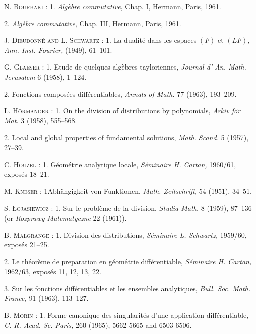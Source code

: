\begin{thebibliography}{99}\pageoriginale
{} \textsc{N. Bourbaki} : 1. {\em Alg\`ebre commutative}, Chap. I, Hermann, Paris, 1961.

 2. {\em Alg\`ebre commutative}, Chap. III, Hermann, Paris, 1961.

 \textsc{J. Dieudonn\'e and L. Schwartz :} 1. La dualit\'e dans les espaces $(F)$ et $(LF)$, {\em Ann. Inst. Fourier,} (1949), 61--101.

 \textsc{G. Glaeser} : 1. Etude de quelques alg\`ebres tayloriennes, {\em Journal d' An. Math. Jerusalem} 6 (1958), 1--124.

 2. Fonctions compos\'ees diff\'erentiables, {\em Annals of Math.} 77 (1963), 193--209.

 \textsc{L. H\"ormander} : 1. On the division of distributions by polynomials, {\em Arkiv f\"or Mat.} 3 (1958), 555--568.

 2. Local and global properties of fundamental solutions, {\em Math. Scand.} 5 (1957), 27--39.

 \textsc{C. Houzel} : 1. G\'eom\'etrie analytique locale, {\em S\'eminaire H. Cartan,} 1960/61, expos\'es 18--21.

 \textsc{M. Kneser} : 1Abh\"angigkeit von Funktionen, {\em Math. Zeitschrift,} 54 (1951), 34--51.

 \textsc{S. {\L}ojasiewicz} : 1. Sur le probl\`eme de la division, {\em Studia Math.} 8 (1959), 87--136 (or {\em Rozprawy Matematyczne} 22 (1961)).

 \textsc{B. Malgrange} : 1. Division des distributions, {\em S\'eminaire L. Schwartz,} 1959/60, expos\'es 21--25.

 2. Le th\'eor\`eme de preparation en g\'eom\'etrie diff\'erentiable, {\em S\'eminaire H. Cartan,} 1962/63, expos\'es 11, 12, 13, 22.

 3. Sur les fonctions diff\'erentiables et les ensembles analytiques, {\em Bull. Soc. Math. France,} 91 (1963), 113--127.

 \textsc{B. Morin} : 1. Forme canonique des singularit\'es d'une application diff\'erentiable, {\em C. R. Acad. Sc. Paris,} 260 (1965), 5662-5665 and 6503-6506.


\end{thebibliography}
